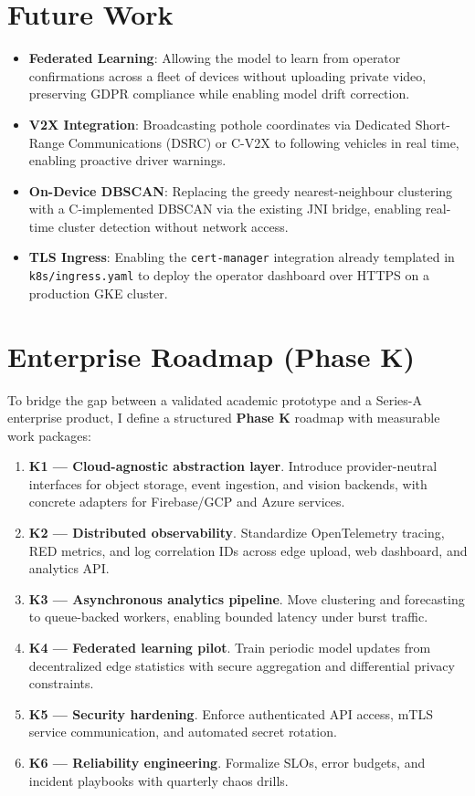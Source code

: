 \section{Future Work}

\begin{itemize}
    \item \textbf{Federated Learning}: Allowing the model to learn from
    operator confirmations across a fleet of devices without uploading
    private video, preserving GDPR compliance while enabling model drift
    correction.

    \item \textbf{V2X Integration}: Broadcasting pothole coordinates via
    Dedicated Short-Range Communications (DSRC) or C-V2X to following
    vehicles in real time, enabling proactive driver warnings.

    \item \textbf{On-Device DBSCAN}: Replacing the greedy nearest-neighbour
    clustering with a C-implemented DBSCAN via the existing JNI bridge,
    enabling real-time cluster detection without network access.

    \item \textbf{TLS Ingress}: Enabling the \texttt{cert-manager}
    integration already templated in \texttt{k8s/ingress.yaml} to deploy
    the operator dashboard over HTTPS on a production GKE cluster.
\end{itemize}

\section{Enterprise Roadmap (Phase K)}
To bridge the gap between a validated academic prototype and a Series-A enterprise product, I define a structured \textbf{Phase K} roadmap with measurable work packages:

\begin{enumerate}
    \item \textbf{K1 --- Cloud-agnostic abstraction layer}. Introduce provider-neutral interfaces for object storage, event ingestion, and vision backends, with concrete adapters for Firebase/GCP and Azure services.
    \item \textbf{K2 --- Distributed observability}. Standardize OpenTelemetry tracing, RED metrics, and log correlation IDs across edge upload, web dashboard, and analytics API.
    \item \textbf{K3 --- Asynchronous analytics pipeline}. Move clustering and forecasting to queue-backed workers, enabling bounded latency under burst traffic.
    \item \textbf{K4 --- Federated learning pilot}. Train periodic model updates from decentralized edge statistics with secure aggregation and differential privacy constraints.
    \item \textbf{K5 --- Security hardening}. Enforce authenticated API access, mTLS service communication, and automated secret rotation.
    \item \textbf{K6 --- Reliability engineering}. Formalize SLOs, error budgets, and incident playbooks with quarterly chaos drills.
\end{enumerate}

